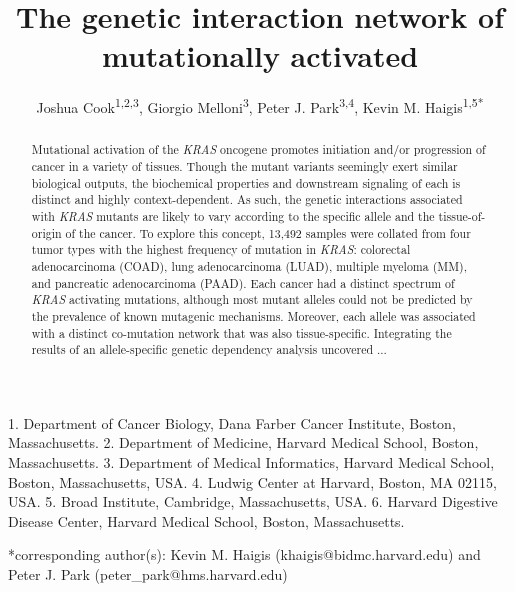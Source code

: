 \documentclass[english, 12pt, letterpaper]{article}
\title{The genetic interaction network of mutationally activated \KRAS{}}
\author{
    Joshua Cook\textsuperscript{1,2,3},
    Giorgio Melloni\textsuperscript{3}, 
    Peter J. Park\textsuperscript{3,4}, 
    Kevin M. Haigis\textsuperscript{1,5{*}}
}
\newcommand{\KRAS}{\emph{KRAS}}
\begin{document}
\maketitle

\thispagestyle{fancy}

1. Department of Cancer Biology, Dana Farber Cancer Institute, Boston, Massachusetts.
2. Department of Medicine, Harvard Medical School, Boston, Massachusetts.
3. Department of Medical Informatics, Harvard Medical School, Boston, Massachusetts, USA.
4. Ludwig Center at Harvard, Boston, MA 02115, USA.
5. Broad Institute, Cambridge, Massachusetts, USA.
6. Harvard Digestive Disease Center, Harvard Medical School, Boston, Massachusetts.

{*}corresponding author(s):
Kevin M. Haigis (khaigis@bidmc.harvard.edu) and Peter J. Park (peter\_park@hms.harvard.edu)

\begin{abstract}
Mutational activation of the  \KRAS{} oncogene promotes initiation and/or progression of cancer in a variety of tissues.
Though the mutant variants seemingly exert similar biological outputs, the biochemical properties and downstream signaling  of each is distinct and highly context-dependent.
As such, the genetic interactions associated with \KRAS{} mutants are likely to vary according to the specific allele and the tissue-of-origin of the cancer.
To explore this concept, 13,492 samples were collated from four tumor types with the highest frequency of mutation in \KRAS{}: colorectal adenocarcinoma (COAD), lung adenocarcinoma (LUAD), multiple myeloma (MM), and pancreatic adenocarcinoma (PAAD).
Each cancer had a distinct spectrum of \KRAS{} activating mutations, although most mutant alleles could not be predicted by the prevalence of known mutagenic mechanisms.
Moreover, each allele was associated with a distinct co-mutation network that was also tissue-specific.
Integrating the results of an allele-specific genetic dependency analysis uncovered ...
 
\end{abstract}
\end{document}

